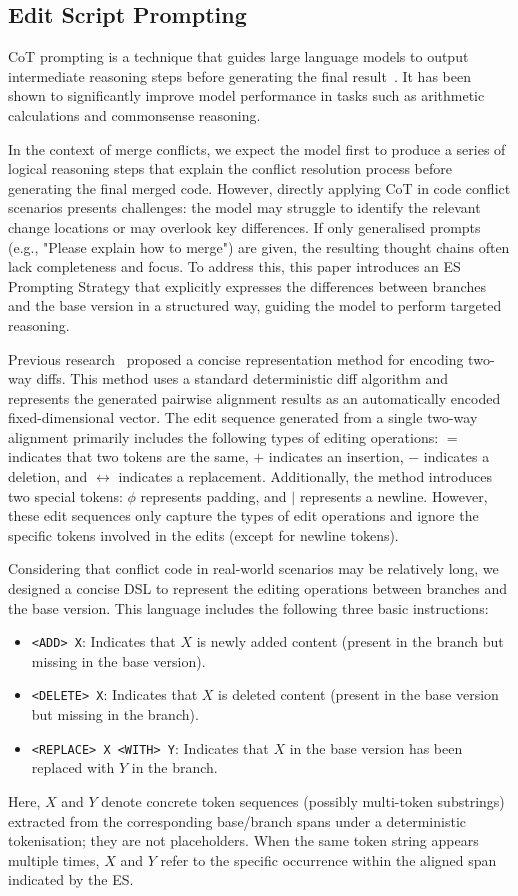 \documentclass[sigconf,review,anonymous]{acmart}
\begin{document}
\subsection{Edit Script Prompting}
CoT prompting is a technique that guides large language models to output intermediate reasoning steps before generating the final result~\cite{cot}.
It has been shown to significantly improve model performance in tasks such as arithmetic calculations and commonsense reasoning. 

In the context of merge conflicts, we expect the model first to produce a series of logical reasoning steps that explain the conflict resolution process before generating the final merged code.
However, directly applying CoT in code conflict scenarios presents challenges: the model may struggle to identify the relevant change locations or may overlook key differences. 
If only generalised prompts (e.g., "Please explain how to merge") are given, the resulting thought chains often lack completeness and focus. 
To address this, this paper introduces an ES Prompting Strategy that explicitly expresses the differences between branches and the base version in a structured way, guiding the model to perform targeted reasoning.

Previous research~\cite{ltre} proposed a concise representation method for encoding two-way diffs. This method uses a standard deterministic diff algorithm and represents the generated pairwise alignment results as an automatically encoded fixed-dimensional vector. The edit sequence generated from a single two-way alignment primarily includes the following types of editing operations: 
$=$ indicates that two tokens are the same, 
$+$ indicates an insertion, 
$-$ indicates a deletion, and 
$\leftrightarrow$ indicates a replacement. 
Additionally, the method introduces two special tokens: 
$\phi$ represents padding, and $|$ represents a newline.
However, these edit sequences only capture the types of edit operations and ignore the specific tokens involved in the edits (except for newline tokens).

Considering that conflict code in real-world scenarios may be relatively long, we designed a concise DSL to represent the editing operations between branches and the base version. This language includes the following three basic instructions:
\begin{itemize}
    \item \texttt{<ADD> X}: Indicates that $X$ is newly added content (present in the branch but missing in the base version).
    \item \texttt{<DELETE> X}: Indicates that $X$ is deleted content (present in the base version but missing in the branch).
    \item \texttt{<REPLACE> X <WITH> Y}: Indicates that $X$ in the base version has been replaced with $Y$ in the branch.
\end{itemize}
Here, $X$ and $Y$ denote concrete token sequences (possibly multi-token substrings) extracted from the corresponding base/branch spans under a deterministic tokenisation; they are not placeholders. When the same token string appears multiple times, $X$ and $Y$ refer to the specific occurrence within the aligned span indicated by the ES.
\end{document}
